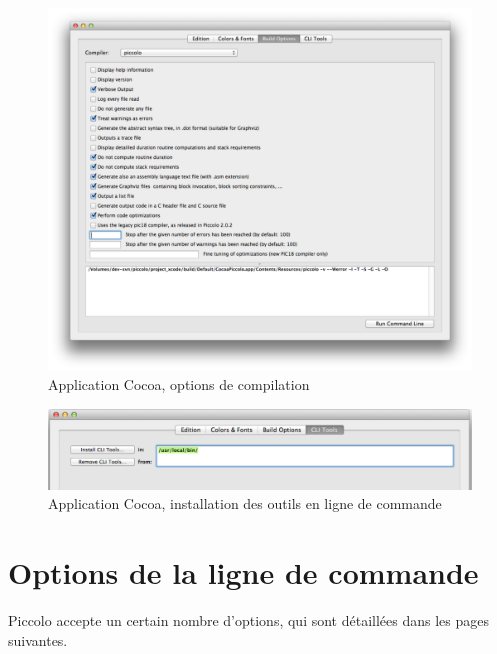 \begin{figure}[t]
  \centering
  \includegraphics[width=1\textwidth]{images/build-options.pdf}
  \caption{Application Cocoa, options de compilation}
  \ligne
\end{figure}



\begin{figure}[t]
  \centering
  \includegraphics[width=1\textwidth]{images/installation-cli-tools.pdf}
  \caption{Application Cocoa, installation des outils en ligne de commande}
  \ligne
\end{figure}



\section{Options de la ligne de commande}


Piccolo accepte un certain nombre d’options, qui sont détaillées dans les pages suivantes.

